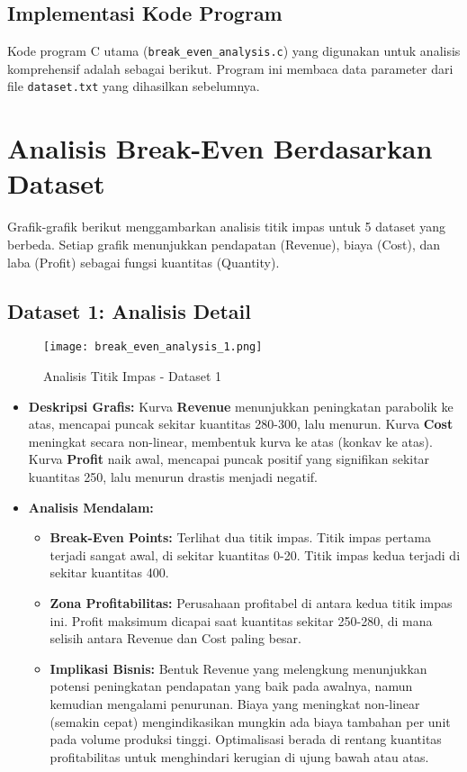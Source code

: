 \documentclass[conference]{IEEEtran}
\begin{document}
\subsection{Implementasi Kode Program}
Kode program C utama (\texttt{break\_even\_analysis.c}) yang digunakan untuk analisis komprehensif adalah sebagai berikut. Program ini membaca data parameter dari file \texttt{dataset.txt} yang dihasilkan sebelumnya.

\section*{Analisis Break-Even Berdasarkan Dataset}

Grafik-grafik berikut menggambarkan analisis titik impas untuk 5 dataset yang berbeda. Setiap grafik menunjukkan pendapatan (Revenue), biaya (Cost), dan laba (Profit) sebagai fungsi kuantitas (Quantity).

\subsection*{Dataset 1: Analisis Detail}
\begin{figure}[H]
    \centering
    \texttt{[image: break\_even\_analysis\_1.png]}
    \caption{Analisis Titik Impas - Dataset 1}
    \label{fig:dataset1_new}
\end{figure}
\begin{itemize}
    \item \textbf{Deskripsi Grafis:} Kurva \textbf{Revenue} menunjukkan peningkatan parabolik ke atas, mencapai puncak sekitar kuantitas 280-300, lalu menurun. Kurva \textbf{Cost} meningkat secara non-linear, membentuk kurva ke atas (konkav ke atas). Kurva \textbf{Profit} naik awal, mencapai puncak positif yang signifikan sekitar kuantitas 250, lalu menurun drastis menjadi negatif.
    \item \textbf{Analisis Mendalam:}
    \begin{itemize}
        \item \textbf{Break-Even Points:} Terlihat dua titik impas. Titik impas pertama terjadi sangat awal, di sekitar kuantitas 0-20. Titik impas kedua terjadi di sekitar kuantitas 400.
        \item \textbf{Zona Profitabilitas:} Perusahaan profitabel di antara kedua titik impas ini. Profit maksimum dicapai saat kuantitas sekitar 250-280, di mana selisih antara Revenue dan Cost paling besar.
        \item \textbf{Implikasi Bisnis:} Bentuk Revenue yang melengkung menunjukkan potensi peningkatan pendapatan yang baik pada awalnya, namun kemudian mengalami penurunan. Biaya yang meningkat non-linear (semakin cepat) mengindikasikan mungkin ada biaya tambahan per unit pada volume produksi tinggi. Optimalisasi berada di rentang kuantitas profitabilitas untuk menghindari kerugian di ujung bawah atau atas.
    \end{itemize}
\end{itemize}
\end{document}
